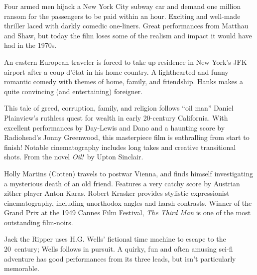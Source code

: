    Four armed men hijack a New York City subway car and demand one million ransom for the passengers to be paid within an hour. Exciting and well-made thriller laced with darkly comedic one-liners. Great performances from Matthau and Shaw, but today the film loses some of the realism and impact it would have had in the 1970s. \author{DW} 

   An eastern European traveler is forced to take up residence in New York's JFK airport after a coup d'\'etat in his home country. A lighthearted and funny romantic comedy with themes of home, family, and friendship. Hanks makes a quite convincing (and entertaining) foreigner. \author{DW} 

   This tale of greed, corruption, family, and religion follows ``oil man'' Daniel Plainview's ruthless quest for wealth in early 20\th-century California. With excellent performances by Day-Lewis and Dano and a haunting score by Radiohead's Jonny Greenwood, this masterpiece film is enthralling from start to finish! Notable cinematography includes long takes and creative transitional shots. From the novel \textit{Oil!}\ by Upton Sinclair. \author{DW} 

   Holly Martins (Cotten) travels to postwar Vienna, and finds himself investigating a mysterious death of an old friend. Features a very catchy score by Austrian zither player Anton Karas. Robert Krasker provides stylistic expressionist cinematography, including unorthodox angles and harsh contrasts. Winner of the Grand Prix at the 1949 Cannes Film Festival, \textit{The Third Man} is one of the most outstanding film-noirs. \author{AW}

   Jack the Ripper uses H.G. Wells' fictional time machine to escape to the 20\th\ century; Wells follows in pursuit. A quirky, fun and often amusing sci-fi adventure has good performances from its three leads, but isn't particularly memorable. \author{DW} 

